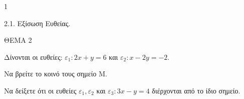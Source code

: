 \begin{ylh}{1}
    \item 2.1. Εξίσωση Ευθείας.
\end{ylh}
ΘΕΜΑ 2

Δίνονται οι ευθείες: $\varepsilon_1 : 2x + y = 6$ και $\varepsilon_2 : x - 2y = -2$.
\begin{alist}
\item Να βρείτε το κοινό τους σημείο M. 
\item Να δείξετε ότι οι ευθείες $\varepsilon_1, \varepsilon_2$ και $\varepsilon_3 : 3x - y = 4$ διέρχονται από το ίδιο σημείο. 
\end{alist}